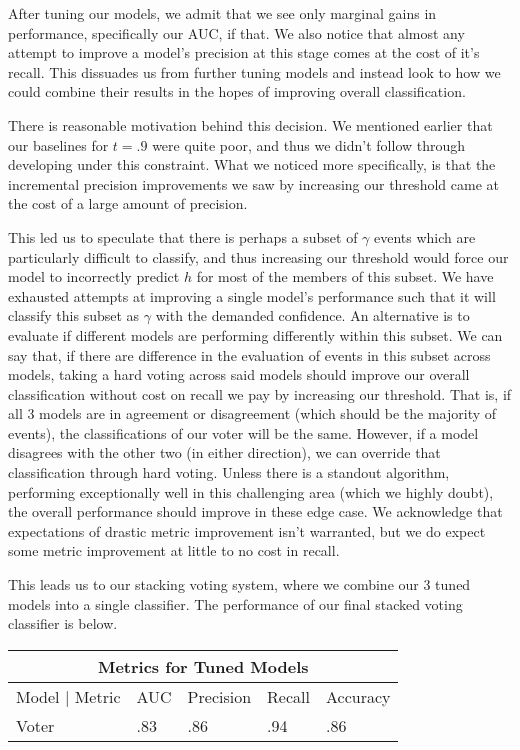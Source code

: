 \documentclass[12pt, a4paper]{article} %
\begin{document}
After tuning our models, we admit that we see only marginal gains in performance, specifically our AUC, if that. We also notice that almost any attempt to improve a model's precision at this stage comes at the cost of it's recall. This dissuades us from further tuning models and instead look to how we could combine their results in the hopes of improving overall classification. 

There is reasonable motivation behind this decision. We mentioned earlier that our baselines for $t=.9$ were quite poor, and thus we didn't follow through developing under this constraint. What we noticed more specifically, is that the incremental precision improvements we saw by increasing our threshold came at the cost of a large amount of precision. 

This led us to speculate that there is perhaps a subset of $\gamma$ events which are particularly difficult to classify, and thus increasing our threshold would force our model to incorrectly predict $h$ for most of the members of this subset. We have exhausted attempts at improving a single model's performance such that it will classify this subset as $\gamma$ with the demanded confidence.  An alternative is to evaluate if different models are performing differently within this subset. We can say that, if there are difference in the evaluation of events in this subset across models, taking a hard voting across said models should improve our overall classification without cost on recall we pay by increasing our threshold. That is, if all 3 models are in agreement or disagreement (which should be the majority of events), the classifications of our voter will be the same. However, if a model disagrees with the other two (in either direction), we can override that classification through hard voting. Unless there is a standout algorithm, performing exceptionally well in this challenging area (which we highly doubt), the overall performance should improve in these edge case. We acknowledge that expectations of drastic metric improvement isn't warranted, but we do expect some metric improvement at little to no cost in recall. 

This leads us to our stacking voting system, where we combine our 3 tuned models into a single classifier. The performance of our final stacked voting classifier is below.

\begin{center}
\begin{tabular}{|p{3cm}||p{2cm}|p{2cm}|p{2cm}|p{2cm}|}
 \hline
 \multicolumn{5}{|c|}{Metrics for Tuned Models} \\
 \hline
 Model | Metric & AUC  & Precision & Recall & Accuracy  \\
 \hline
 Voter  & .83 & .86 & .94 & .86 \\
 \hline
\end{tabular}
\end{center}
\end{document}
